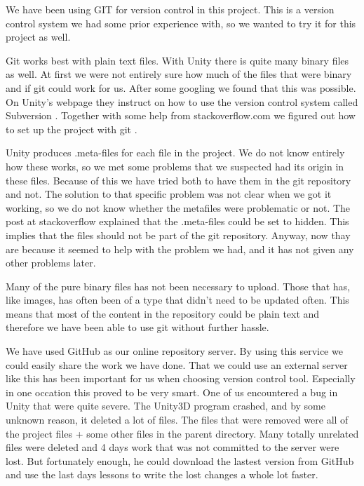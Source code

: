 We have been using GIT for version control in this project. This is a version
control system we had some prior experience with, so we wanted to try it for 
this project as well. 

Git works best with plain text files. With Unity there is quite many binary
files as well. At first we were not entirely sure how much of the files that
were binary and if git could work for us. After some googling we found that 
this was possible. On Unity's webpage they instruct on how to use the version
control system called Subversion \cite{SubversionControl}. Together with some
help from stackoverflow.com we figured out how to set up the project with git
\cite{gitVersionControl}.

Unity produces .meta-files for each file in the project. We do not know 
entirely how these works, so we met some problems that we suspected had its
origin in these files. Because of this we have tried both to have them in
the git repository and not. The solution to that specific problem was not
clear when we got it working, so we do not know whether the metafiles were
problematic or not. The post at stackoverflow explained that the .meta-files 
could be set to hidden. This implies that the files should not be part
of the git repository. Anyway, now thay are because it seemed to help with the
problem we had, and it has not given any other problems later.

Many of the pure binary files has not been necessary to upload. Those that
has, like images, has often been of a type that didn't need to be updated
often. This means that most of the content in the repository could be plain
text and therefore we have been able to use git without further hassle.

We have used GitHub \cite{GitHub} as our online repository server. By using
this service we could easily share the work we have done. That we could use
an external server like this has been important for us when choosing version
control tool. Especially in one occation this proved to be very smart. One of
us encountered a bug in Unity that were quite severe. The Unity3D program
crashed, and by some unknown reason, it deleted a lot of files. The files that
were removed were all of the project files + some other files in the parent
directory. Many totally unrelated files were deleted and 4 days work that was
not committed to the server were lost. But fortunately enough, he could
download the lastest version from GitHub and use the last days lessons to write
the lost changes a whole lot faster.

